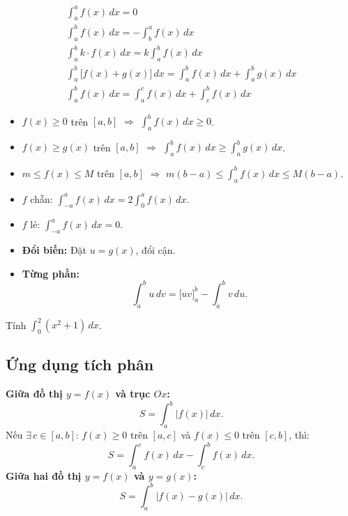 \documentclass[12pt,a4paper]{article}
\begin{document}
\begin{tinhchat}
  \begin{gather*}
    \int_a^a f(x)\,dx = 0 \\[4pt]
    \int_a^b f(x)\,dx = -\int_b^a f(x)\,dx \\[4pt]
    \int_a^b k \cdot f(x)\,dx = k \int_a^b f(x)\,dx \\[4pt]
    \int_a^b \bigl[f(x) + g(x)\bigr]\,dx = \int_a^b f(x)\,dx + \int_a^b g(x)\,dx \\[4pt]
    \int_a^b f(x)\,dx = \int_a^c f(x)\,dx + \int_c^b f(x)\,dx
  \end{gather*}
  \begin{itemize}
    \item $f(x) \ge 0$ trên $[a,b]$ $\Rightarrow$ $\displaystyle\int_a^b f(x)\,dx \ge 0$.
    \item $f(x) \ge g(x)$ trên $[a,b]$ $\Rightarrow$ $\displaystyle\int_a^b f(x)\,dx \ge \int_a^b g(x)\,dx$.
    \item $m \le f(x) \le M$ trên $[a,b]$ $\Rightarrow$ $m(b-a) \le \displaystyle\int_a^b f(x)\,dx \le M(b-a)$.
    \item $f$ chẵn: $\displaystyle\int_{-a}^{a} f(x)\,dx = 2\int_0^a f(x)\,dx$.
    \item $f$ lẻ: $\displaystyle\int_{-a}^{a} f(x)\,dx = 0$.
  \end{itemize}
\end{tinhchat}

\begin{phuongphap}[title={Các phương pháp tính tích phân}]
  \begin{itemize}
    \item \textbf{Đổi biến:} Đặt $u = g(x)$, đổi cận.
    \item \textbf{Từng phần:}
      \[
        \int_a^b u\,dv = \bigl[uv\bigr]_a^b - \int_a^b v\,du.
      \]
  \end{itemize}
\end{phuongphap}

\begin{vidu}
  Tính $\displaystyle\int_0^2 (x^2 + 1)\,dx$.
\end{vidu}

\subsection{Ứng dụng tích phân}

\begin{congthuc}[title={Diện tích hình phẳng}]
  \textbf{Giữa đồ thị $y = f(x)$ và trục $Ox$:}
  \[
    S = \int_a^b \bigl|f(x)\bigr|\,dx.
  \]
  Nếu $\exists\, c \in [a,b]$: $f(x) \ge 0$ trên $[a,c]$ và $f(x) \le 0$ trên $[c,b]$, thì:
  \[
    S = \int_a^c f(x)\,dx - \int_c^b f(x)\,dx.
  \]
  \textbf{Giữa hai đồ thị $y = f(x)$ và $y = g(x)$:}
  \[
    S = \int_a^b \bigl|f(x) - g(x)\bigr|\,dx.
  \]
\end{congthuc}
\end{document}
